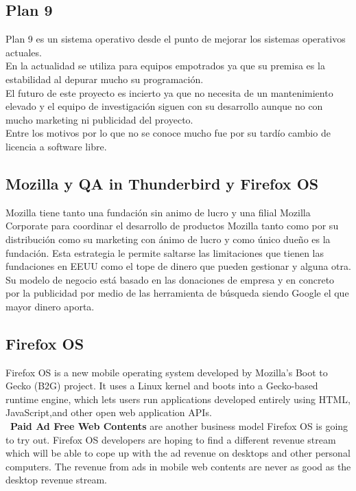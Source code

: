 \documentclass[12pt]{article} %
\begin{document}
\subsection{Plan 9} %

Plan 9 es un sistema operativo desde el punto de mejorar los sistemas operativos actuales.\\En la actualidad se utiliza para equipos empotrados ya que su premisa es la estabilidad al depurar mucho su programación.\\El futuro de este proyecto es incierto ya que no necesita de un mantenimiento elevado y el equipo de investigación siguen con su desarrollo aunque no con mucho marketing ni publicidad del proyecto.\\Entre los motivos por lo que no se conoce mucho fue por su tardío cambio de licencia a software libre. 
\subsection{Mozilla y QA in Thunderbird y Firefox OS} %

Mozilla tiene tanto una fundación sin animo de lucro y una filial Mozilla Corporate para coordinar el desarrollo de productos Mozilla tanto como por su distribución como su marketing con ánimo de lucro y como único dueño es la fundación. Esta estrategia le permite saltarse las limitaciones que tienen las fundaciones en EEUU como el tope de dinero que pueden gestionar y alguna otra.\\ Su modelo de negocio está basado en las donaciones de empresa y en concreto por la publicidad por medio de las herramienta de búsqueda siendo Google el que mayor dinero aporta.
\subsection{ Firefox OS} %
Firefox OS is a new mobile operating system developed by Mozilla's Boot to Gecko (B2G) project. It uses a Linux kernel and boots into a Gecko-based runtime engine, which lets users run applications developed entirely using HTML, JavaScript,and other open web application APIs.
\\\
{\bf Paid Ad Free Web Contents} are another business model Firefox OS is going to try out. Firefox OS developers are hoping to find a different revenue stream which will be able to cope up with the ad revenue on desktops and other personal computers. The revenue from ads in mobile web contents are never as good as the desktop revenue stream. 
\end{document}
